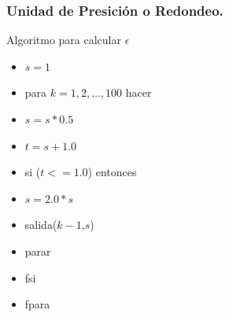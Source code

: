 \documentclass{beamer}
\begin{document}
\frame
{
  \frametitle{Unidad de Presici\'on o Redondeo.}
  Algoritmo para calcular $\epsilon$
  \begin{itemize}
  \item<1->[1.] $s=1$
  \item<2->[2.] para $k=1,2,\ldots,100$ hacer
  \item<3->[3.] \qquad $s= s*0.5$
  \item<4->[4.] \qquad $t=s+1.0$
  \item<5->[5.] \qquad si ($t<=1.0$) entonces
  \item<6->[6.] \qquad\qquad $s=2.0*s$
  \item<7->[7.] \qquad\qquad salida($k-1$,$s$)
  \item<8->[8.] \qquad\qquad parar
  \item<9->[9.] \qquad fsi
  \item<10->[10.] fpara
  \end{itemize}
}
\end{document}
